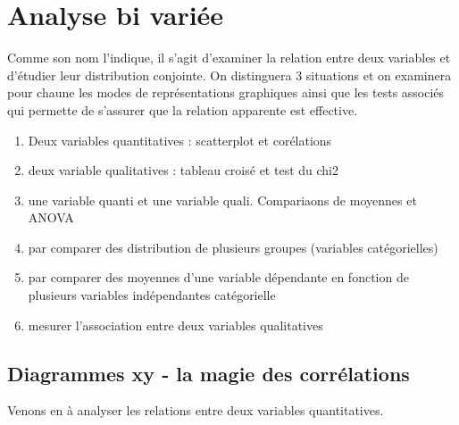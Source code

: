 \documentclass[
]{book}
\newenvironment{Shaded}{\begin{snugshade}}{\end{snugshade}}
\newcommand{\CommentTok}[1]{\textcolor[rgb]{0.56,0.35,0.01}{\textit{#1}}}
\newcommand{\DataTypeTok}[1]{\textcolor[rgb]{0.13,0.29,0.53}{#1}}
\newcommand{\FloatTok}[1]{\textcolor[rgb]{0.00,0.00,0.81}{#1}}
\newcommand{\KeywordTok}[1]{\textcolor[rgb]{0.13,0.29,0.53}{\textbf{#1}}}
\newcommand{\NormalTok}[1]{#1}
\newcommand{\OperatorTok}[1]{\textcolor[rgb]{0.81,0.36,0.00}{\textbf{#1}}}
\newcommand{\StringTok}[1]{\textcolor[rgb]{0.31,0.60,0.02}{#1}}
\begin{document}
\hypertarget{analyse-bi-variuxe9e}{%
\chapter{Analyse bi variée}\label{analyse-bi-variuxe9e}}

Comme son nom l'indique, il s'agit d'examiner la relation entre deux variables et d'étudier leur distribution conjointe. On distinguera 3 situations et on examinera pour chaune les modes de représentations graphiques ainsi que les tests associés qui permette de s'assurer que la relation apparente est effective.

\begin{enumerate}
\def\labelenumi{\alph{enumi})}
\item
  Deux variables quantitatives : scatterplot et corélations
\item
  deux variable qualitatives : tableau croisé et test du chi2
\item
  une variable quanti et une variable quali. Compariaons de moyennes et ANOVA
\item
  par comparer des distribution de plusieurs groupes (variables catégorielles)
\item
  par comparer des moyennes d'une variable dépendante en fonction de plusieurs variables indépendantes catégorielle
\item
  mesurer l'association entre deux variables qualitatives
\end{enumerate}

\hypertarget{diagrammes-xy---la-magie-des-corruxe9lations}{%
\section{Diagrammes xy - la magie des corrélations}\label{diagrammes-xy---la-magie-des-corruxe9lations}}

Venons en à analyser les relations entre deux variables quantitatives.

\begin{Shaded}
\end{Shaded}
\end{document}
